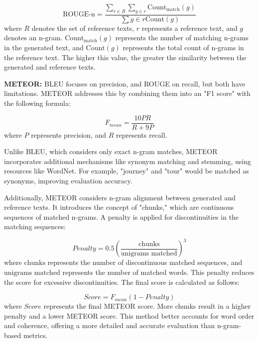 \documentclass[acmsmall, screen]{acmart}
\begin{document}
\begin{equation}
\text{ROUGE-n} = \frac{
    \sum_{r \in R} \sum_{g \in r} \text{Count}_{\text{match}}(g)
}{
    \sum{g \in r} \text{Count}(g)
}
\end{equation}
where \( R \) denotes the set of reference texts, \( r \) represents a reference text, and \( g \) denotes an n-gram. \(\text{Count}_{\text{match}}(g)\) represents the number of matching n-grams in the generated text, and \(\text{Count}(g)\) represents the total count of n-grams in the reference text. The higher this value, the greater the similarity between the generated and reference texts.

\textbf{METEOR\cite{banerjee_acl05_meteor}:} BLEU focuses on precision, and ROUGE on recall, but both have limitations. METEOR addresses this by combining them into an "F1 score" with the following formula:

\begin{equation}
F_{mean} = \frac{10PR}{R+9P}
\end{equation}
where \( P \) represents precision, and \( R \) represents recall.

Unlike BLEU, which considers only exact n-gram matches, METEOR incorporates additional mechanisms like synonym matching and stemming, using resources like WordNet. For example, "journey" and "tour" would be matched as synonyms, improving evaluation accuracy.

Additionally, METEOR considers n-gram alignment between generated and reference texts. It introduces the concept of "chunks," which are continuous sequences of matched n-grams. A penalty is applied for discontinuities in the matching sequences:

\begin{equation}
Penalty = 0.5 \left( \frac{\text{chunks}}{\text{unigrams matched}} \right)^3
\end{equation}
where \(\text{chunks}\) represents the number of discontinuous matched sequences, and \(\text{unigrams matched}\) represents the number of matched words. This penalty reduces the score for excessive discontinuities. The final score is calculated as follows:

\begin{equation}
Score = F_{mean}(1 - Penalty)
\end{equation}
where \( Score \) represents the final METEOR score. More chunks result in a higher penalty and a lower METEOR score. This method better accounts for word order and coherence, offering a more detailed and accurate evaluation than n-gram-based metrics.
\end{document}
